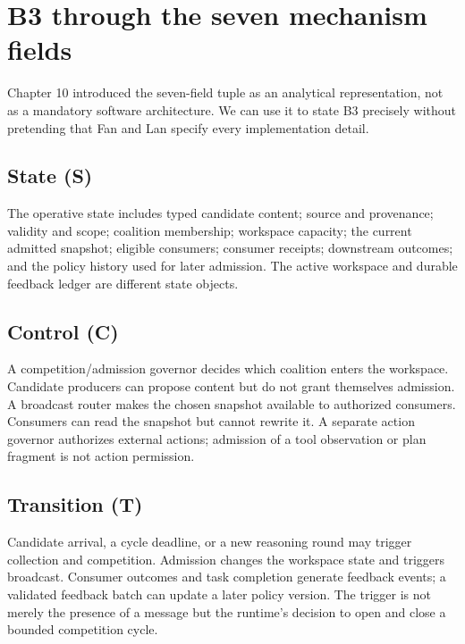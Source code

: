 \section{B3 through the seven mechanism fields}
\label{sec:ch14-seven-fields}

Chapter 10 introduced the seven-field tuple as an analytical representation, not as a mandatory software architecture. We can use it to state B3 precisely without pretending that Fan and Lan specify every implementation detail.

\subsection{State (S)}

The operative state includes typed candidate content; source and provenance; validity and scope; coalition membership; workspace capacity; the current admitted snapshot; eligible consumers; consumer receipts; downstream outcomes; and the policy history used for later admission. The active workspace and durable feedback ledger are different state objects.

\subsection{Control (C)}

A competition/admission governor decides which coalition enters the workspace. Candidate producers can propose content but do not grant themselves admission. A broadcast router makes the chosen snapshot available to authorized consumers. Consumers can read the snapshot but cannot rewrite it. A separate action governor authorizes external actions; admission of a tool observation or plan fragment is not action permission.

\subsection{Transition (T)}

Candidate arrival, a cycle deadline, or a new reasoning round may trigger collection and competition. Admission changes the workspace state and triggers broadcast. Consumer outcomes and task completion generate feedback events; a validated feedback batch can update a later policy version. The trigger is not merely the presence of a message but the runtime's decision to open and close a bounded competition cycle.

